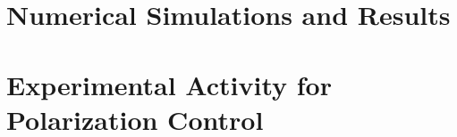 \documentclass{Configuration_Files/PoliMi3i_thesis}
\begin{document}
\chapter{Numerical Simulations and Results}

\label{ch:03_numerical_simulations_results}




\chapter{Experimental Activity for Polarization Control}
\label{ch:04_experimental_activity}





% 






\cleardoublepage


\appendix

% 

\end{document}
